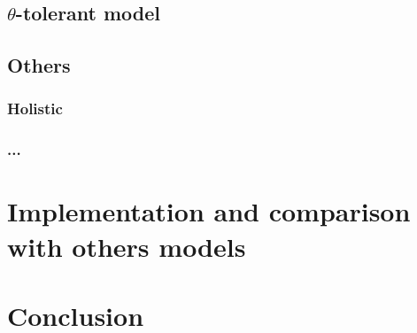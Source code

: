 \documentclass[letterpaper, 12pt]{report}
\begin{document}
\section{$\theta$-tolerant model}
\section{Others}
\subsection{Holistic}
\subsection{...}

\chapter{Implementation and comparison with others models}
\chapter{Conclusion}






\newpage
\appendix
\end{document}
